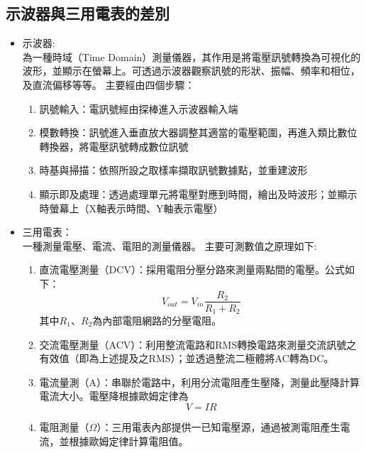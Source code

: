 \documentclass[12pt,a4paper]{article}
\begin{document}
\begin{CJK}{UTF8}{bkai}
\clearpage
\subsection{示波器與三用電表的差別}\label{subsec:2}

\begin{itemize}
    \item 示波器:\\
    為一種時域（Time Domain）測量儀器，其作用是將電壓訊號轉換為可視化的波形，並顯示在螢幕上。可透過示波器觀察訊號的形狀、振幅、頻率和相位，及直流偏移等等。
    \newline
    主要經由四個步驟：
    \begin{enumerate}
        \item 訊號輸入：電訊號經由探棒進入示波器輸入端
        \item 模數轉換：訊號進入垂直放大器調整其適當的電壓範圍，再進入類比數位轉換器，將電壓訊號轉成數位訊號
        \item 時基與掃描：依照所設之取樣率擷取訊號數據點，並重建波形
        \item 顯示即及處理：透過處理單元將電壓對應到時間，繪出及時波形；並顯示時螢幕上（X軸表示時間、Y軸表示電壓）
    \end{enumerate}
    \item 三用電表：\\
    一種測量電壓、電流、電阻的測量儀器。
    \newline
    主要可測數值之原理如下:
    \begin{enumerate}
        \item 直流電壓測量（DCV）：採用電阻分壓分路來測量兩點間的電壓。公式如下：
        \begin{equation}
            V_{out} = V_{in} \frac{R_{2}}{R_{1}+R_{2}}
        \end{equation}
        其中$R_{1}$、$R_{2}$為內部電阻網路的分壓電阻。
        \item 交流電壓測量（ACV）：利用整流電路和RMS轉換電路來測量交流訊號之有效值（即為上述提及之RMS）；並透過整流二極體將AC轉為DC。
        \item 電流量測（A）：串聯於電路中，利用分流電阻產生壓降，測量此壓降計算電流大小。電壓降根據歐姆定律為
        \begin{equation}
            V = IR
        \end{equation}
        \item 電阻測量（$\Omega$）：三用電表內部提供一已知電壓源，通過被測電阻產生電流，並根據歐姆定律計算電阻值。
    \end{enumerate}

\end{itemize}
\end{CJK}
\end{document}
